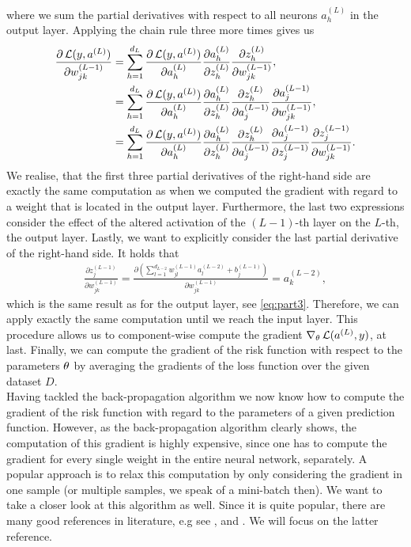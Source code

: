 where we sum the partial derivatives with respect to all neurons $a_h^{(L)}$ in the output layer. Applying the chain rule three more times gives us
\begin{align*}
\frac{\partial \operatorname{\mathcal{L}}(y, a^{(L)})}{\partial w^{(L-1)}_{jk}} &= \sum_{h=1}^{d_L}\frac{\partial \operatorname{\mathcal{L}}(y, a^{(L)})}{\partial a_h^{(L)}} \frac{\partial a_h^{(L)}}{\partial z_h^{(L)}} \frac{\partial z_h^{(L)}}{\partial w^{(L-1)}_{jk}},\\
&= \sum_{h=1}^{d_L}\frac{\partial \operatorname{\mathcal{L}}(y, a^{(L)})}{\partial a_h^{(L)}} \frac{\partial a_h^{(L)}}{\partial z_h^{(L)}} \frac{\partial z_h^{(L)}}{\partial a_j^{(L-1)}} \frac{\partial a_j^{(L-1)}}{\partial w^{(L-1)}_{jk}},\\
&= \sum_{h=1}^{d_L}\frac{\partial \operatorname{\mathcal{L}}(y, a^{(L)})}{\partial a_h^{(L)}} \frac{\partial a_h^{(L)}}{\partial z_h^{(L)}} \frac{\partial z_h^{(L)}}{\partial a_j^{(L-1)}} \frac{\partial a_j^{(L-1)}}{\partial z_j^{(L-1)}} \frac{\partial z_j^{(L-1)}}{\partial w^{(L-1)}_{jk}}.
\end{align*}
We realise, that the first three partial derivatives of the right-hand side are exactly the same computation as when we computed the gradient with regard to a weight that is located in the output layer. Furthermore, the last two expressions consider the effect of the altered activation of the $(L-1)$-th layer on the $L$-th, the output layer. Lastly, we want to explicitly consider the last partial derivative of the right-hand side. It holds that
\begin{align*}
\frac{\partial z_j^{(L-1)}}{\partial w^{(L-1)}_{jk}} = \frac{\partial \left(\sum_{l=1}^{d_{L-2}} w_{jl}^{(L-1)}a_l^{(L-2)} + b_j^{(L-1)}\right)}{\partial w^{(L-1)}_{jk}} = a_k^{(L-2)},
\end{align*}
which is the same result as for the output layer, see \eqref{eq:part3}. Therefore, we can apply exactly the same computation until we reach the input layer. This procedure allows us to component-wise compute the gradient $\nabla_{\theta}\operatorname{\mathcal{L}}(a^{(L)}, y)$, at last. Finally, we can compute the gradient of the risk function with respect to the parameters $\theta$ by averaging the gradients of the loss function over the given dataset $D$.\\
Having tackled the back-propagation algorithm we now know how to compute the gradient of the risk function with regard to the parameters of a given prediction function. However, as the back-propagation algorithm clearly shows, the computation of this gradient is highly expensive, since one has to compute the gradient for every single weight in the entire neural network, separately. A popular approach is to relax this computation by only considering the gradient in one sample (or multiple samples, we speak of a mini-batch then). We want to take a closer look at this algorithm as well. Since it is quite popular, there are many good references in literature, e.g see \cite[Chapter~13.3.2]{sra2012optimization}, \cite[Chapter~4.2]{saad2009line} and \cite{turinici2021convergence}. We will focus on the latter reference.\\
